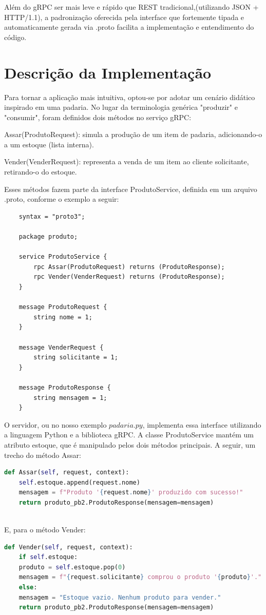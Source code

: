 \documentclass[12pt]{article}
\begin{document}
Além do gRPC ser mais leve e rápido que REST tradicional,(utilizando JSON + HTTP/1.1), a padronização oferecida pela interface que fortemente tipada e automaticamente gerada via .proto facilita a implementação e entendimento do código.

\section{Descrição da Implementação}
Para tornar a aplicação mais intuitiva, optou-se por adotar um cenário didático inspirado em uma padaria. No lugar da terminologia genérica "produzir" e "consumir", foram definidos dois métodos no serviço gRPC:

Assar(ProdutoRequest): simula a produção de um item de padaria, adicionando-o a um estoque (lista interna).

Vender(VenderRequest): representa a venda de um item ao cliente solicitante, retirando-o do estoque.

Esses métodos fazem parte da interface ProdutoService, definida em um arquivo .proto, conforme o exemplo a seguir:
\begin{lstlisting}
	syntax = "proto3";
	
	package produto;
	
	service ProdutoService {
		rpc Assar(ProdutoRequest) returns (ProdutoResponse);
		rpc Vender(VenderRequest) returns (ProdutoResponse);
	}
	
	message ProdutoRequest {
		string nome = 1;
	}
	
	message VenderRequest {
		string solicitante = 1;
	}
	
	message ProdutoResponse {
		string mensagem = 1;
	}
\end{lstlisting}

O servidor, ou no nosso exemplo $padaria.py$, implementa essa interface utilizando a linguagem Python e a biblioteca gRPC. A classe ProdutoService mantém um atributo estoque, que é manipulado pelos dois métodos principais. A seguir, um trecho do método Assar:

\begin{lstlisting}[language=Python]
	def Assar(self, request, context):
	self.estoque.append(request.nome)
	mensagem = f"Produto '{request.nome}' produzido com sucesso!"
	return produto_pb2.ProdutoResponse(mensagem=mensagem)
	
\end{lstlisting}

E, para o método Vender:
\begin{lstlisting}[language=Python]
	def Vender(self, request, context):
	if self.estoque:
	produto = self.estoque.pop(0)
	mensagem = f"{request.solicitante} comprou o produto '{produto}'."
	else:
	mensagem = "Estoque vazio. Nenhum produto para vender."
	return produto_pb2.ProdutoResponse(mensagem=mensagem)
\end{lstlisting}
\end{document}
